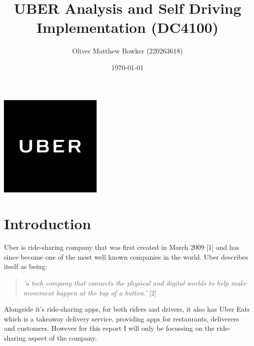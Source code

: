 \documentclass{article}
\title{UBER Analysis and Self Driving Implementation (DC4100)}
\author{Oliver Matthew Bowker (220263618)}
\date{\today}
\begin{document}
    \maketitle
    \begin{center}
      \includegraphics[width=5cm]{assets/uber_logo.png}
    \end{center}
    \newpage

    \tableofcontents
    \newpage

    \section{Introduction}
    Uber is ride-sharing company that was first created in March 2009 [1] and has since become one of the most well known companies in the world.
    Uber describes itself as being:
    \begin{quote}
      \textit{'a tech company that connects the physical and digital worlds to help make movement happen at the tap of a button.'} [2]
    \end{quote}
    Alongside it's ride-sharing apps, for both riders and drivers, it also has Uber Eats which is a takeaway delivery service, providing apps for restaurants,
    deliverers and customers. However for this report I will only be focussing on the ride-sharing aspect of the company.
\end{document}
